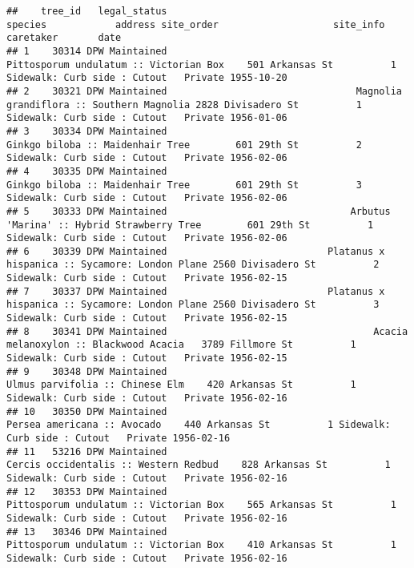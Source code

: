 \documentclass[
]{article}
\begin{document}
\begin{verbatim}
##    tree_id   legal_status                                                                   species            address site_order                    site_info caretaker       date
## 1    30314 DPW Maintained                                    Pittosporum undulatum :: Victorian Box    501 Arkansas St          1 Sidewalk: Curb side : Cutout   Private 1955-10-20
## 2    30321 DPW Maintained                                 Magnolia grandiflora :: Southern Magnolia 2828 Divisadero St          1 Sidewalk: Curb side : Cutout   Private 1956-01-06
## 3    30334 DPW Maintained                                          Ginkgo biloba :: Maidenhair Tree        601 29th St          2 Sidewalk: Curb side : Cutout   Private 1956-02-06
## 4    30335 DPW Maintained                                          Ginkgo biloba :: Maidenhair Tree        601 29th St          3 Sidewalk: Curb side : Cutout   Private 1956-02-06
## 5    30333 DPW Maintained                                Arbutus 'Marina' :: Hybrid Strawberry Tree        601 29th St          1 Sidewalk: Curb side : Cutout   Private 1956-02-06
## 6    30339 DPW Maintained                            Platanus x hispanica :: Sycamore: London Plane 2560 Divisadero St          2 Sidewalk: Curb side : Cutout   Private 1956-02-15
## 7    30337 DPW Maintained                            Platanus x hispanica :: Sycamore: London Plane 2560 Divisadero St          3 Sidewalk: Curb side : Cutout   Private 1956-02-15
## 8    30341 DPW Maintained                                    Acacia melanoxylon :: Blackwood Acacia   3789 Fillmore St          1 Sidewalk: Curb side : Cutout   Private 1956-02-15
## 9    30348 DPW Maintained                                           Ulmus parvifolia :: Chinese Elm    420 Arkansas St          1 Sidewalk: Curb side : Cutout   Private 1956-02-16
## 10   30350 DPW Maintained                                               Persea americana :: Avocado    440 Arkansas St          1 Sidewalk: Curb side : Cutout   Private 1956-02-16
## 11   53216 DPW Maintained                                     Cercis occidentalis :: Western Redbud    828 Arkansas St          1 Sidewalk: Curb side : Cutout   Private 1956-02-16
## 12   30353 DPW Maintained                                    Pittosporum undulatum :: Victorian Box    565 Arkansas St          1 Sidewalk: Curb side : Cutout   Private 1956-02-16
## 13   30346 DPW Maintained                                    Pittosporum undulatum :: Victorian Box    410 Arkansas St          1 Sidewalk: Curb side : Cutout   Private 1956-02-16

\end{verbatim}
\end{document}
